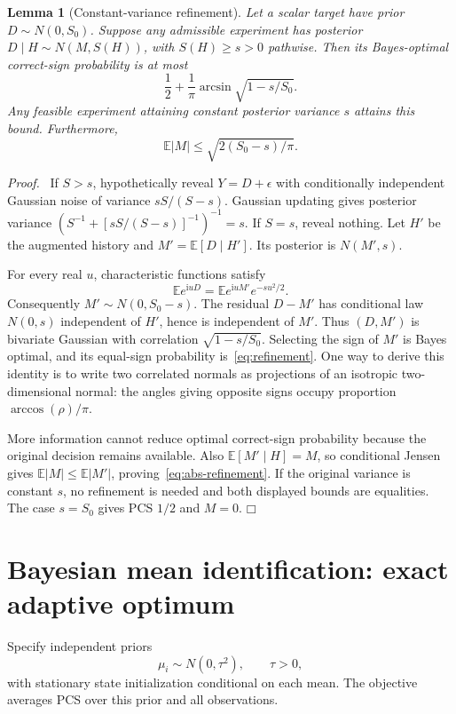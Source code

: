 \documentclass[11pt]{article}
\newtheorem{lemma}[theorem]{Lemma}
\newenvironment{proof}{\par\noindent\textit{Proof.}\ }{\hfill$\mdlgwhtsquare$\par\medskip}
\newcommand{\E}{\mathbb E}
\begin{document}
\begin{lemma}[Constant-variance refinement]
Let a scalar target have prior $D\sim N(0,S_0)$. Suppose any admissible experiment has posterior $D\mid H\sim N(M,S(H))$, with $S(H)\geq s>0$ pathwise. Then its Bayes-optimal correct-sign probability is at most
\begin{equation}
\frac12+\frac1\pi\arcsin\sqrt{1-s/S_0}.
\label{eq:refinement}
\end{equation}
Any feasible experiment attaining constant posterior variance $s$ attains this bound. Furthermore,
\begin{equation}
\E|M|\leq\sqrt{2(S_0-s)/\pi}.
\label{eq:abs-refinement}
\end{equation}
\end{lemma}
\begin{proof}
If $S>s$, hypothetically reveal $Y=D+\epsilon$ with conditionally independent Gaussian noise of variance $sS/(S-s)$. Gaussian updating gives posterior variance
$(S^{-1}+[sS/(S-s)]^{-1})^{-1}=s$.
If $S=s$, reveal nothing. Let $H'$ be the augmented history and $M'=\E[D\mid H']$. Its posterior is $N(M',s)$.

For every real $u$, characteristic functions satisfy
\[
\E e^{\mathrm i uD}=\E e^{\mathrm i uM'}e^{-su^2/2}.
\]
Consequently $M'\sim N(0,S_0-s)$. The residual $D-M'$ has conditional law $N(0,s)$ independent of $H'$, hence is independent of $M'$. Thus $(D,M')$ is bivariate Gaussian with correlation $\sqrt{1-s/S_0}$. Selecting the sign of $M'$ is Bayes optimal, and its equal-sign probability is~\eqref{eq:refinement}. One way to derive this identity is to write two correlated normals as projections of an isotropic two-dimensional normal: the angles giving opposite signs occupy proportion $\arccos(\rho)/\pi$.

More information cannot reduce optimal correct-sign probability because the original decision remains available. Also $\E[M'\mid H]=M$, so conditional Jensen gives $\E|M|\leq\E|M'|$, proving~\eqref{eq:abs-refinement}. If the original variance is constant $s$, no refinement is needed and both displayed bounds are equalities. The case $s=S_0$ gives PCS $1/2$ and $M=0$.
\end{proof}

\section{Bayesian mean identification: exact adaptive optimum}
Specify independent priors
\begin{equation}
\mu_i\sim N(0,\tau^2),\qquad \tau>0,
\end{equation}
with stationary state initialization conditional on each mean. The objective averages PCS over this prior and all observations.
\end{document}
